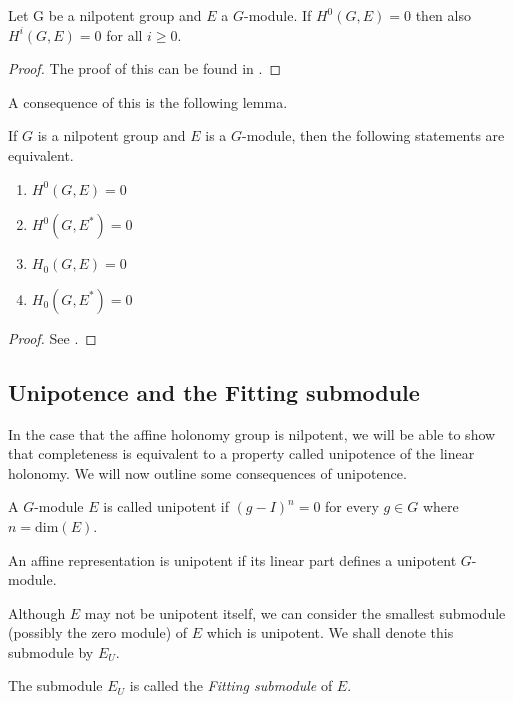 \begin{lemma}
    Let G be a nilpotent group and $E$ a $G$-module. If $H^0(G, E) = 0$ then
    also $H^i(G, E) = 0$ for all $i \geq 0$.
    \label{lemma:nilpotent-group-coho}
\end{lemma}
\begin{proof}
    The proof of this can be found in \cite{Hirsch1978}.
\end{proof}

A consequence of this is the following lemma.
\begin{lemma}
    If $G$ is a nilpotent group and $E$ is a $G$-module, then the following statements are equivalent.
    \label{lemma:nilpotent-group-equiv-hom-coho}
    \begin{enumerate}
        \item $H^0(G, E) = 0$
        \item $H^0(G, E^*) = 0$
        \item $H_0(G, E) = 0$
        \item $H_0(G, E^*) = 0$
    \end{enumerate}
\end{lemma}

\begin{proof}
    See \cite{nilpotent-holonomy}.
\end{proof}
\subsection{Unipotence and the Fitting submodule}
In the case that the affine holonomy group is nilpotent, we will be able to
show that completeness is equivalent to a property called unipotence of the
linear holonomy. We will now outline some consequences of unipotence.

\begin{definition}[Unipotent]
    A $G$-module $E$ is called unipotent if $(g-I)^n = 0$ for every $g \in G$
    where $n = \text{dim}(E)$.
\end{definition}
\begin{definition}
    An affine representation is unipotent if its linear part defines a unipotent
    $G$-module.
\end{definition}

Although $E$ may not be unipotent itself, we can consider the smallest
submodule (possibly the zero module) of $E$ which is unipotent. We shall denote
this submodule by $E_U$.

\begin{remark}
    The submodule $E_U$ is called the \textit{Fitting submodule} of $E$.
\end{remark}

